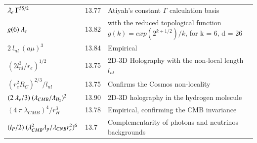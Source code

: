 \documentclass[a4paper,9pt]{article}
\begin{document}
\begin{table}
\begin{tabular}{lll}
$ \lambdabar_{e} ~\Gamma^{55/2}$ & 13.77 & Atiyah's constant $\Gamma$ calculation basis   \\  
  
  
 
 
 
 
 $ g(6) ~\lambdabar_{e} $ & 13.82 & with the reduced topological function $g(k) = exp(2^{k+1/2})/k$, for k = 6, d = 26  \\
 
 
 $ 2~l_{nl}~(a\mu)^3 $ & 13.84 & Empirical \\
 
 
 
 
 
 
 
 
 $ (2l_{nl}^3/r_e)^{1/2}$  & 13.75    & 2D-3D Holography with the non-local length $l_{nl}$ \\
 
  $ (r_e^2R_C)^{2/3}/l_{nl}$  & 13.75    & Confirms the Cosmos non-locality \\
  
 
 
 $ (2~\lambdabar_{e}/3) ~(\lambdabar_{CMB}/\lambdabar_{H_2})^2$ & 13.90 &  2D-3D holography in the hydrogen molecule \\
     
   $ (4~\pi ~\lambda_{CMB})^4/r_H^3$ & 13.78 &  Empirical, confirming the CMB invariance \\
   
    $ (l_P/2)~(\lambdabar_{CMB}^2\lambdabar_p/\lambdabar_{CNB}r_e^2)^6$  & 13.7    & Complementarity of photons and neutrinos backgrounds \\
   
 
 
 \bottomrule
  \end{tabular}
\end{table} 
 
\end{document}
